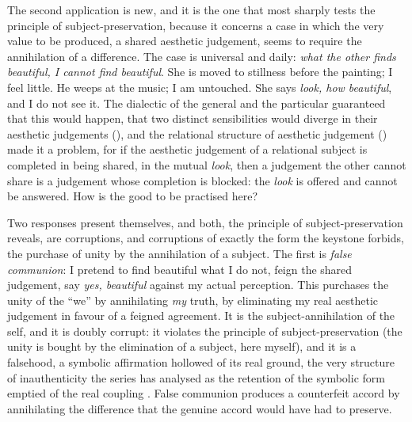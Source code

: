 The second application is new, and it is the one that most sharply tests the principle of subject-preservation, because it concerns a case in which the very value to be produced, a shared aesthetic judgement, seems to require the annihilation of a difference. The case is universal and daily: \emph{what the other finds beautiful, I cannot find beautiful}. She is moved to stillness before the painting; I feel little. He weeps at the music; I am untouched. She says \emph{look, how beautiful}, and I do not see it. The dialectic of the general and the particular guaranteed that this would happen, that two distinct sensibilities would diverge in their aesthetic judgements (), and the relational structure of aesthetic judgement () made it a problem, for if the aesthetic judgement of a relational subject is completed in being shared, in the mutual \emph{look}, then a judgement the other cannot share is a judgement whose completion is blocked: the \emph{look} is offered and cannot be answered. How is the good to be practised here?

Two responses present themselves, and both, the principle of subject-preservation reveals, are corruptions, and corruptions of exactly the form the keystone forbids, the purchase of unity by the annihilation of a subject. The first is \emph{false communion}: I pretend to find beautiful what I do not, feign the shared judgement, say \emph{yes, beautiful} against my actual perception. This purchases the unity of the ``we'' by annihilating \emph{my} truth, by eliminating my real aesthetic judgement in favour of a feigned agreement. It is the subject-annihilation of the self, and it is doubly corrupt: it violates the principle of subject-preservation (the unity is bought by the elimination of a subject, here myself), and it is a falsehood, a symbolic affirmation hollowed of its real ground, the very structure of inauthenticity the series has analysed as the retention of the symbolic form emptied of the real coupling \parencite{paperxiii}. False communion produces a counterfeit accord by annihilating the difference that the genuine accord would have had to preserve.

